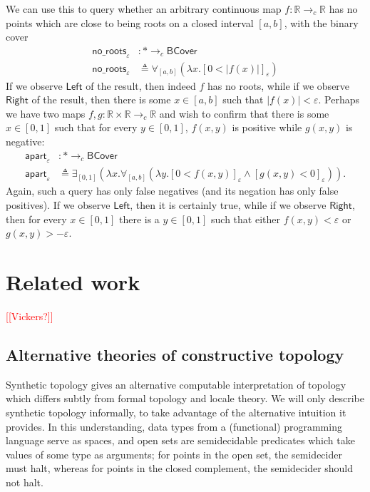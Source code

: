\documentclass[conference]{IEEEtran}
\newcommand{\cto}{\to_c}
\newcommand{\R}{\mathbb{R}}
\newcommand{\One}{\ast}
\newcommand{\note}[1]{\textcolor{red}{[[{#1}]]}}
\begin{document}
We can use this to query whether an arbitrary continuous map $f : \R \cto \R$ has no points which are close to being roots on a closed interval $[a, b]$, with the binary cover
\begin{align*}
\mathsf{no\_roots}_{\varepsilon} &: \One \cto \mathsf{BCover}
\\ \mathsf{no\_roots}_\varepsilon &\triangleq
  \forall_{[a,b]}(\lambda x. [ 0 < |f(x)| ]_\varepsilon)
\end{align*}
If we observe $\mathsf{Left}$ of the result, then indeed $f$ has no roots, while if we observe $\mathsf{Right}$ of the result, then there is some $x \in [a, b]$ such that $|f(x)| < \varepsilon$. Perhaps we have two maps $f, g : \R \times \R \cto \R$ and wish to confirm that there is some $x \in [0,1]$ such that for every $y \in [0,1]$, $f(x, y)$ is positive while $g(x,y)$ is negative:
\begin{align*}
\mathsf{apart}_{\varepsilon} &: \One \cto \mathsf{BCover}
\\ \mathsf{apart}_\varepsilon &\triangleq
  \exists_{[0,1]}(\lambda x. \forall_{[a,b]}(\lambda y. [ 0 < f(x, y) ]_\varepsilon \wedge [g(x, y) < 0]_\varepsilon)).
\end{align*}
Again, such a query has only false negatives (and its negation has only false positives). If we observe $\mathsf{Left}$, then it is certainly true, while if we observe $\mathsf{Right}$, then for every $x \in [0,1]$ there is a $y \in [0,1]$ such that either $f(x, y) < \varepsilon$ or $g(x, y) > -\varepsilon$.

\section{Related work}

\note{Vickers?}

\subsection{Alternative theories of constructive topology}

Synthetic topology gives an alternative computable interpretation of topology which differs subtly from formal topology and locale theory\cite{escardo2004, lesnik}. We will only describe synthetic topology informally, to take advantage of the alternative intuition it provides. In this understanding, data types from a (functional) programming language serve as spaces, and open sets are semidecidable predicates which take values of some type as arguments; for points in the open set, the semidecider must halt, whereas for points in the closed complement, the semidecider should not halt.
\end{document}
